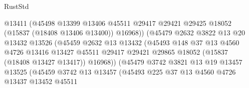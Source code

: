 \begin{lexlean}{RustStd}
\begin{coremodule}
{\begin{coremodule}
{{{{{{{{{{{{{{{{{{{{{{{{{{{{{{{{{{{{{{{{{{{{{{{{{{{{{{{{{{{{                                    @13411
                                    (@45498
                                      @13399
                                      @13406
                                      @45511
                                      @29417
                                      @29421
                                      @29425
                                      @18052
                                      (@15837 (@18408 @13406 @13400))
                                      @16968))
                                  (@45479
                                    @2632
                                    @3822
                                    @13
                                    @20
                                    @13432
                                    @13526
                                    (@45459
                                      @2632
                                      @13
                                      @13432
                                      (@45493
                                        @148
                                        @37
                                        @13
                                        @4560
                                        @4726
                                        @13416
                                        @13427
                                        @45511
                                        @29417
                                        @29421
                                        @29865
                                        @18052
                                        (@15837 (@18408 @13427 @13417))
                                        @16968))
                                    (@45479
                                      @3742
                                      @3821
                                      @13
                                      @19
                                      @13457
                                      @13525
                                      (@45459
                                        @3742
                                        @13
                                        @13457
                                        (@45493
                                          @225
                                          @37
                                          @13
                                          @4560
                                          @4726
                                          @13437
                                          @13452
                                          @45511
}}}}}}}}}}}}}}}}}}}}}}}}}}}}}}}}}}}}}}}}}}}}}}}}}}}}}}}}}}}}
\end{coremodule}}
\end{coremodule}
\end{lexlean}
